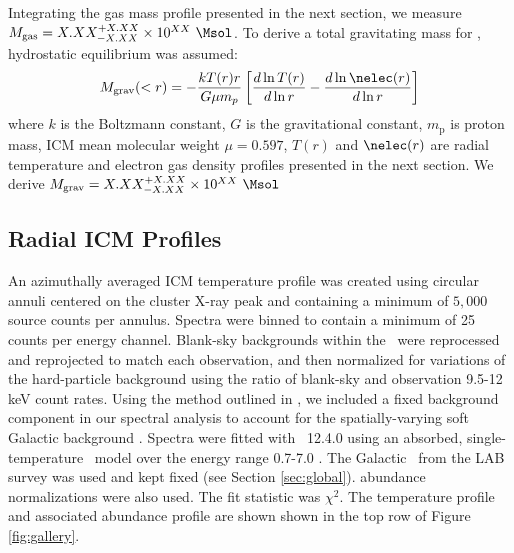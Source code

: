 \documentclass{emulateapj}
\begin{document}
Integrating the gas mass profile presented in the next section, we
measure $M_{\mathrm{gas}} =
X.XX^{+X.XX}_{-X.XX}\times10^{XX}~\Msol$. To derive a total
gravitating mass for \rxj, hydrostatic equilibrium was assumed:
\begin{equation}
  M_{\mathrm{grav}}(< r) = -\frac{k T(r) r}{G \mu m_p}\left[\frac{d\ln
      T(r)}{d\ln r} - \frac{d\ln \nelec(r)}{d\ln r}\right]
\end{equation}
where $k$ is the Boltzmann constant, $G$ is the gravitational
constant, $m_{\mathrm{p}}$ is proton mass, ICM mean molecular weight
$\mu = 0.597$, $T(r)$ and $\nelec(r)$ are radial temperature and
electron gas density profiles presented in the next section. We derive
$M_{\mathrm{grav}} = X.XX^{+X.XX}_{-X.XX}\times10^{XX}~\Msol$

\subsection{Radial ICM Profiles}
\label{sec:rad}

An azimuthally averaged ICM temperature profile was created using
circular annuli centered on the cluster X-ray peak and containing a
minimum of $5,000$ source counts per annulus. Spectra were binned to
contain a minimum of 25 counts per energy channel.  Blank-sky
backgrounds within the \caldb\ were reprocessed and reprojected to
match each observation, and then normalized for variations of the
hard-particle background using the ratio of blank-sky and observation
9.5-12 keV count rates. Using the method outlined in
\citet{2005ApJ...628..655V}, we included a fixed background component
in our spectral analysis to account for the spatially-varying soft
Galactic background \citep[see also][for more
  detail]{xrayband}. Spectra were fitted with \xspec\ 12.4.0
\citep{xspec} using an absorbed, single-temperature \mekal\ model
\citep{mekal1, mekal2} over the energy range 0.7-7.0 \keV. The
Galactic \nhi\ from the LAB survey was used and kept fixed (see
Section \ref{sec:global}). \citet{ag89} abundance normalizations were
also used. The fit statistic was $\chi^2$. The temperature profile and
associated abundance profile are shown shown in the top row of Figure
\ref{fig:gallery}.
\end{document}

